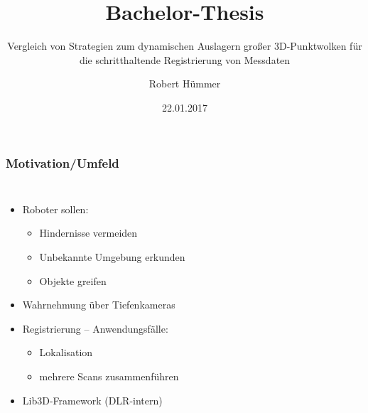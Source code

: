 \documentclass[presentation]{beamer}
\title[Bachelor-Thesis]{Bachelor-Thesis} %
\subtitle{Vergleich von Strategien zum dynamischen Auslagern großer 3D-Punktwolken für die schritthaltende Registrierung von Messdaten}
\author{Robert Hümmer} %
\institute[Fakultät für Informatik] %
{
	University of Applied Science Rosenheim \\
	\medskip
	\textit{robert.huemmer@gmail.com} %
}
\date{22.01.2017} %
\begin{document}

\maketitle %

\begin{frame}
\frametitle{Motivation/Umfeld}

\begin{columns}[c] %
	\begin{itemize}
		\item Roboter sollen:
		\begin{itemize} 
			\item Hindernisse vermeiden
			\item Unbekannte Umgebung erkunden
			\item Objekte greifen
		\end{itemize}
		\item Wahrnehmung über Tiefenkameras
		\item Registrierung -- Anwendungsfälle:
		\begin{itemize}
		\item Lokalisation
		\item mehrere Scans zusammenführen
		\end{itemize}
		\item Lib3D-Framework (DLR-intern)
	\end{itemize}
	\begin{figure}
		\centering

\end{figure}
\end{columns}
\end{frame}
\end{document}
